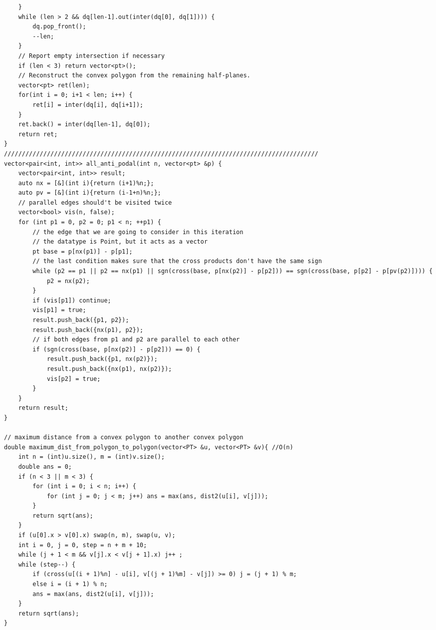 \documentclass[twoside]{article}
\begin{document}
\begin{multicols*}{2}
\begin{verbatim}
    }
    while (len > 2 && dq[len-1].out(inter(dq[0], dq[1]))) {
        dq.pop_front();
        --len;
    }
    // Report empty intersection if necessary
    if (len < 3) return vector<pt>();
    // Reconstruct the convex polygon from the remaining half-planes.
    vector<pt> ret(len);
    for(int i = 0; i+1 < len; i++) {
        ret[i] = inter(dq[i], dq[i+1]);
    }
    ret.back() = inter(dq[len-1], dq[0]);
    return ret;
}
////////////////////////////////////////////////////////////////////////////////////////
vector<pair<int, int>> all_anti_podal(int n, vector<pt> &p) {
    vector<pair<int, int>> result;
    auto nx = [&](int i){return (i+1)%n;};
    auto pv = [&](int i){return (i-1+n)%n;};
    // parallel edges should't be visited twice
    vector<bool> vis(n, false);
    for (int p1 = 0, p2 = 0; p1 < n; ++p1) {
        // the edge that we are going to consider in this iteration
        // the datatype is Point, but it acts as a vector
        pt base = p[nx(p1)] - p[p1];
        // the last condition makes sure that the cross products don't have the same sign
        while (p2 == p1 || p2 == nx(p1) || sgn(cross(base, p[nx(p2)] - p[p2])) == sgn(cross(base, p[p2] - p[pv(p2)]))) {
            p2 = nx(p2);
        }
        if (vis[p1]) continue;
        vis[p1] = true;
        result.push_back({p1, p2});
        result.push_back({nx(p1), p2});
        // if both edges from p1 and p2 are parallel to each other
        if (sgn(cross(base, p[nx(p2)] - p[p2])) == 0) {
            result.push_back({p1, nx(p2)});
            result.push_back({nx(p1), nx(p2)});
            vis[p2] = true;
        }
    }
    return result;
}

// maximum distance from a convex polygon to another convex polygon
double maximum_dist_from_polygon_to_polygon(vector<PT> &u, vector<PT> &v){ //O(n)
    int n = (int)u.size(), m = (int)v.size();
    double ans = 0;
    if (n < 3 || m < 3) {
        for (int i = 0; i < n; i++) {
            for (int j = 0; j < m; j++) ans = max(ans, dist2(u[i], v[j]));
        }
        return sqrt(ans);
    }
    if (u[0].x > v[0].x) swap(n, m), swap(u, v);
    int i = 0, j = 0, step = n + m + 10;
    while (j + 1 < m && v[j].x < v[j + 1].x) j++ ;
    while (step--) {
        if (cross(u[(i + 1)%n] - u[i], v[(j + 1)%m] - v[j]) >= 0) j = (j + 1) % m;
        else i = (i + 1) % n;
        ans = max(ans, dist2(u[i], v[j]));
    }
    return sqrt(ans);
}
\end{verbatim}

{
}
\end{multicols*}
\end{document}
